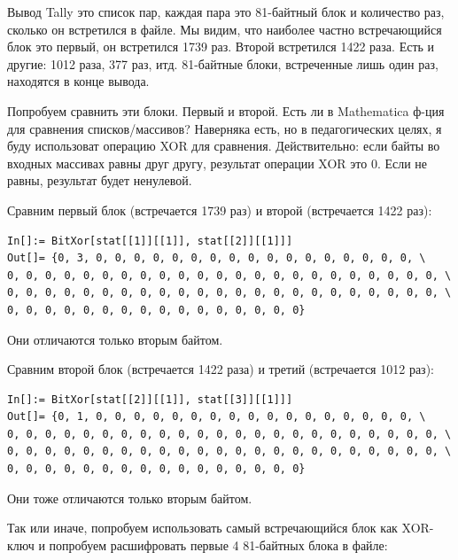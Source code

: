 Вывод Tally это список пар, каждая пара это 81-байтный блок и количество раз, сколько он встретился в файле.
Мы видим, что наиболее частно встречающийся блок это первый, он встретился 1739 раз.
Второй встретился 1422 раза. Есть и другие: 1012 раза, 377 раз, итд.
81-байтные блоки, встреченные лишь один раз, находятся в конце вывода.

Попробуем сравнить эти блоки. Первый и второй.
Есть ли в Mathematica ф-ция для сравнения списков/массивов?
Наверняка есть, но в педагогических целях, я буду использоват операцию XOR для сравнения.
Действительно: если байты во входных массивах равны друг другу, результат операции XOR это 0.
Если не равны, результат будет ненулевой.

Сравним первый блок (встречается 1739 раз) и второй (встречается 1422 раз):

\begin{lstlisting}[style=custommath]
In[]:= BitXor[stat[[1]][[1]], stat[[2]][[1]]]
Out[]= {0, 3, 0, 0, 0, 0, 0, 0, 0, 0, 0, 0, 0, 0, 0, 0, 0, 0, 0, \
0, 0, 0, 0, 0, 0, 0, 0, 0, 0, 0, 0, 0, 0, 0, 0, 0, 0, 0, 0, 0, 0, 0, \
0, 0, 0, 0, 0, 0, 0, 0, 0, 0, 0, 0, 0, 0, 0, 0, 0, 0, 0, 0, 0, 0, 0, \
0, 0, 0, 0, 0, 0, 0, 0, 0, 0, 0, 0, 0, 0, 0, 0}
\end{lstlisting}

Они отличаются только вторым байтом.

Сравним второй блок (встречается 1422 раза) и третий (встречается 1012 раз):

\begin{lstlisting}[style=custommath]
In[]:= BitXor[stat[[2]][[1]], stat[[3]][[1]]]
Out[]= {0, 1, 0, 0, 0, 0, 0, 0, 0, 0, 0, 0, 0, 0, 0, 0, 0, 0, 0, \
0, 0, 0, 0, 0, 0, 0, 0, 0, 0, 0, 0, 0, 0, 0, 0, 0, 0, 0, 0, 0, 0, 0, \
0, 0, 0, 0, 0, 0, 0, 0, 0, 0, 0, 0, 0, 0, 0, 0, 0, 0, 0, 0, 0, 0, 0, \
0, 0, 0, 0, 0, 0, 0, 0, 0, 0, 0, 0, 0, 0, 0, 0}
\end{lstlisting}

Они тоже отличаются только вторым байтом.

Так или иначе, попробуем использовать самый встречающийся блок как XOR-ключ и попробуем расшифровать первые 4 81-байтных
блока в файле:

